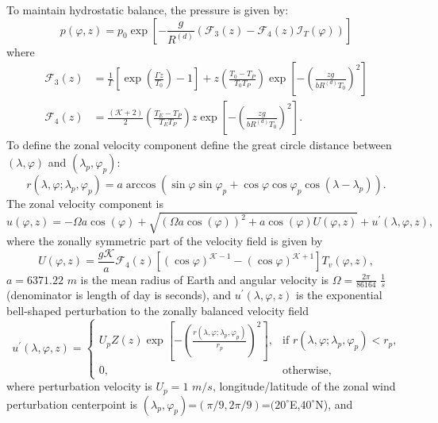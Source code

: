 \documentclass{agujournal}
\begin{document}
To maintain hydrostatic balance, the pressure is given by:
\begin{equation}
p(\varphi, z) = p_0\exp \left[ -\frac{g}{R^{(d)}}(\mathcal{F}_{3}(z) -\mathcal{F}_{4}(z) \mathcal{I}_T(\varphi) ) \right]\label{eq:baroPmoist}
\end{equation} where
\begin{align}
\mathcal{F}_{3}(z) &=\frac{1}{\Gamma} \left[ \exp\left( \frac{\Gamma z}{T_0} \right)-1 \right] + z \left(\frac{T_0-T_P}{T_0T_P} \right) \exp\left[-\left(\frac{z g}{b R^{(d)} T_0}\right)^2\right] \\
\mathcal{F}_{4}(z) &=\frac{({\mathcal{K}}+2)}{2} \left(\frac{T_E-T_P}{T_E T_P} \right) z \exp\left[-\left(\frac{z g}{b R^{(d)} T_0}\right)^2\right].
\end{align}    
To define the zonal velocity component define the great circle distance between $(\lambda,\varphi)$ and $(\lambda_p,\varphi_p)$:
\begin{equation}
r(\lambda, \varphi; \lambda_p, \varphi_p) = a \arccos \left( \sin \varphi \sin \varphi_p + \cos \varphi \cos \varphi_p \cos (\lambda - \lambda_p) \right).
\end{equation}
The zonal velocity component is
\begin{equation}
u(\varphi, z) = -\Omega a \cos(\varphi)+\sqrt{(\Omega a\cos(\varphi))^2+ a\cos(\varphi)U(\varphi,z)}+u^\prime(\lambda, \varphi, z),
\end{equation} where the zonally symmetric part of the velocity field is given by
\begin{equation}
U(\varphi,z) = \frac{g {\mathcal{K}}}{a} \mathcal{F}_{4}(z) \left[ (\cos \varphi)^{{\mathcal{K}} - 1} - (\cos \varphi)^{{\mathcal{K}} + 1} \right] T_v(\varphi, z),
\end{equation} 
$a=6371.22$ $m$ is the mean radius of Earth and angular velocity is $\Omega=\frac{2\pi}{86164}$ $\frac{1}{s}$ (denominator is length of day is seconds), and $u^\prime(\lambda, \varphi, z)$ is the exponential bell-shaped perturbation to the zonally balanced velocity field
\begin{equation}
u^\prime(\lambda, \varphi, z) = \left\{ \begin{array}{ll} U_p Z(z)  \exp \left[ - \left( \frac{r(\lambda, \varphi; \lambda_p, \varphi_p)}{r_p} \right)^2 \right], & \mbox{if $r(\lambda, \varphi; \lambda_p, \varphi_p) < r_p$,} \\ 0, & \mbox{otherwise,} \end{array} \right.
\end{equation} where perturbation velocity is $U_p=1$ $m/s$, longitude/latitude of the zonal wind perturbation centerpoint is $(\lambda_p,\varphi_p)$=$(\pi/9,2\pi/9)$=$(20^{\circ}$E,$40^{\circ}$N),  and
\end{document}

